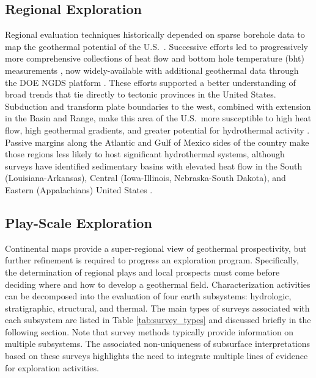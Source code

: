 \subsection{Regional Exploration}\label{ch2:regional_expl}
Regional evaluation techniques historically depended on sparse borehole data to map the geothermal potential of the U.S.\ \citep{kehle_aapg_1970}. Successive efforts led to progressively more comprehensive collections of heat flow and bottom hole temperature (\acrshort{bht}) measurements \citep{blackwell_heat_1990, blackwell_temperature-at-depth_2011, muffler_assessment_1979, sorey_low-temperature_1983, wisian_heat_1999}, now widely-available with additional geothermal data through the DOE NGDS platform \citep{anderson_national_2013}. These efforts supported a better understanding of broad trends that tie directly to tectonic provinces in the United States. Subduction and transform plate boundaries to the west, combined with extension in the Basin and Range, make this area of the U.S.\ more susceptible to high heat flow, high geothermal gradients, and greater potential for hydrothermal activity \citep{mariner_low-temperature_1983}. Passive margins along the Atlantic and Gulf of Mexico sides of the country make those regions less likely to host significant hydrothermal systems, although surveys have identified sedimentary basins with elevated heat flow in the South (Louisiana-Arkansas), Central (Iowa-Illinois, Nebraska-South Dakota), and Eastern (Appalachians) United States \citep{blackwell_geothermal_1995, sorey_low-temperature_1983}.

\subsection{Play-Scale Exploration}\label{ch2:play_scale_expl}
Continental maps provide a super-regional view of geothermal prospectivity, but further refinement is required to progress an exploration program. Specifically, the determination of regional plays and local prospects must come before deciding where and how to develop a geothermal field. Characterization activities can be decomposed into the evaluation of four earth subsystems: hydrologic, stratigraphic, structural, and thermal. The main types of surveys associated with each subsystem are listed in Table \ref{tab:survey_types} and discussed briefly in the following section. Note that survey methods typically provide information on multiple subsystems. The associated non-uniqueness of subsurface interpretations based on these surveys highlights the need to integrate multiple lines of evidence for exploration activities. 

